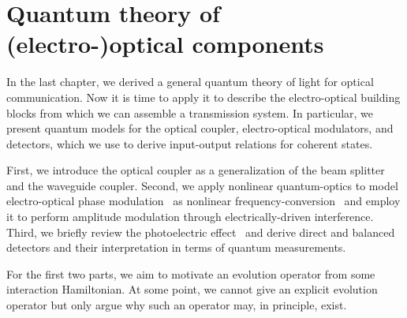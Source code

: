 \chapter{Quantum theory of (electro-)optical components}\label{ch:components}

In the last chapter, we derived a general quantum theory of light for optical communication.
Now it is time to apply it to describe the electro-optical building blocks from which we can assemble a transmission system.
In particular, we present quantum models for the optical coupler, electro-optical modulators, and detectors, which we use to derive input-output relations for coherent states.

First, we introduce the optical coupler as a generalization of the beam splitter and the waveguide coupler.
Second, we apply nonlinear quantum-optics to model electro-optical phase modulation~\cite{Horoshko2018} as nonlinear frequency-conversion~\cite{QuesadaMejia2015} and employ it to perform amplitude modulation through electrically-driven interference.
Third, we briefly review the photoelectric effect~\cite{Mandel1995,Vogel2006} and derive direct and balanced detectors and their interpretation in terms of quantum measurements.

For the first two parts, we aim to motivate an evolution operator from some interaction Hamiltonian. 
At some point, we cannot give an explicit evolution operator but only argue why such an operator may, in principle, exist.
